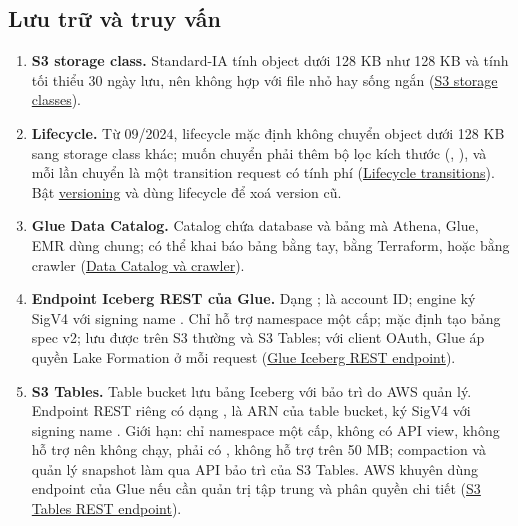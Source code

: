 \subsection{Lưu trữ và truy vấn}
\begin{enumerate}[resume]
  \item \textbf{S3 storage class.} Standard-IA tính object dưới 128 KB như 128 KB và tính tối thiểu 30 ngày lưu, nên không hợp với file nhỏ hay sống ngắn (\href{https://docs.aws.amazon.com/AmazonS3/latest/userguide/storage-class-intro.html}{S3 storage classes}).
  \item \textbf{Lifecycle.} Từ 09/2024, lifecycle mặc định không chuyển object dưới 128 KB sang storage class khác; muốn chuyển phải thêm bộ lọc kích thước (, ), và mỗi lần chuyển là một transition request có tính phí (\href{https://docs.aws.amazon.com/AmazonS3/latest/userguide/lifecycle-transition-general-considerations.html}{Lifecycle transitions}). Bật \href{https://docs.aws.amazon.com/AmazonS3/latest/userguide/Versioning.html}{versioning} và dùng lifecycle để xoá version cũ.
  \item \textbf{Glue Data Catalog.} Catalog chứa database và bảng mà Athena, Glue, EMR dùng chung; có thể khai báo bảng bằng tay, bằng Terraform, hoặc bằng crawler (\href{https://docs.aws.amazon.com/glue/latest/dg/catalog-and-crawler.html}{Data Catalog và crawler}).
  \item \textbf{Endpoint Iceberg REST của Glue.} Dạng ;  là account ID; engine ký SigV4 với signing name . Chỉ hỗ trợ namespace một cấp; mặc định tạo bảng spec v2; lưu được trên S3 thường và S3 Tables; với client OAuth, Glue áp quyền Lake Formation ở mỗi request (\href{https://docs.aws.amazon.com/glue/latest/dg/connect-glu-iceberg-rest.html}{Glue Iceberg REST endpoint}).
  \item \textbf{S3 Tables.} Table bucket lưu bảng Iceberg với bảo trì do AWS quản lý. Endpoint REST riêng có dạng ,  là ARN của table bucket, ký SigV4 với signing name . Giới hạn: chỉ namespace một cấp, không có API view, không hỗ trợ  nên  không chạy,  phải có , không hỗ trợ  trên 50 MB; compaction và quản lý snapshot làm qua API bảo trì của S3 Tables. AWS khuyên dùng endpoint của Glue nếu cần quản trị tập trung và phân quyền chi tiết (\href{https://docs.aws.amazon.com/AmazonS3/latest/userguide/s3-tables-integrating-open-source.html}{S3 Tables REST endpoint}).

\end{enumerate}
